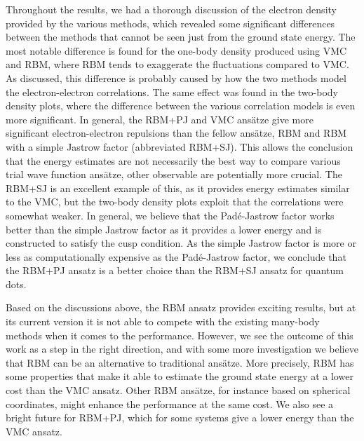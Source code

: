 Throughout the results, we had a thorough discussion of the electron density provided by the various methods, which revealed some significant differences between the methods that cannot be seen just from the ground state energy. The most notable difference is found for the one-body density produced using VMC and RBM, where RBM tends to exaggerate the fluctuations compared to VMC. As discussed, this difference is probably caused by how the two methods model the electron-electron correlations. The same effect was found in the two-body density plots, where the difference between the various correlation models is even more significant. In general, the RBM+PJ and VMC ansätze give more significant electron-electron repulsions than the fellow ansätze, RBM and RBM with a simple Jastrow factor (abbreviated RBM+SJ). This allows the conclusion that the energy estimates are not necessarily the best way to compare various trial wave function ansätze, other observable are potentially more crucial. The RBM+SJ is an excellent example of this, as it provides energy estimates similar to the VMC, but the two-body density plots exploit that the correlations were somewhat weaker. In general, we believe that the Padé-Jastrow factor works better than the simple Jastrow factor as it provides a lower energy and is constructed to satisfy the cusp condition. As the simple Jastrow factor is more or less as computationally expensive as the Padé-Jastrow factor, we conclude that the RBM+PJ ansatz is a better choice than the RBM+SJ ansatz for quantum dots.

Based on the discussions above, the RBM ansatz provides exciting results, but at its current version it is not able to compete with the existing many-body methods when it comes to the performance. However, we see the outcome of this work as a step in the right direction, and with some more investigation we believe that RBM can be an alternative to traditional ansätze. More precisely, RBM has some properties that make it able to estimate the ground state energy at a lower cost than the VMC ansatz. Other RBM ansätze, for instance based on spherical coordinates, might enhance the performance at the same cost. We also see a bright future for RBM+PJ, which for some systems give a lower energy than the VMC ansatz.

